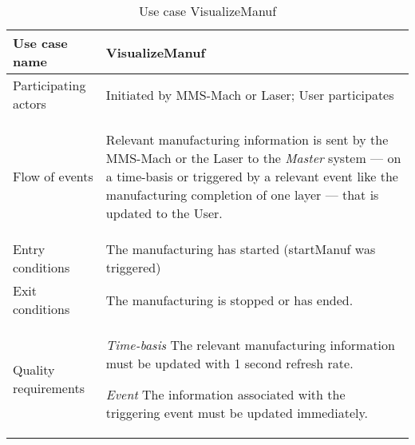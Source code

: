 \begin{table}[!hbt]
  \captionsetup{justification=raggedright, singlelinecheck=false}
  \caption{Use case VisualizeManuf}
  \centering
  \begin{tabular}{p{}p{}}
    \hline
    Use case name & \textbf{VisualizeManuf} \\ \hline
     Participating actors      & Initiated by MMS-Mach or Laser; User participates \\ \hline
     Flow of events & \begin{enum-c}
     \item Relevant manufacturing information is sent by the MMS-Mach or the
       Laser to the \emph{Master} system --- on a time-basis or triggered by a
       relevant event like the manufacturing completion of one layer --- that is
       updated to the User.
     \end{enum-c}\\ \hline 
     Entry conditions & The manufacturing has started (startManuf was
     triggered)\\ \hline
      Exit conditions & The manufacturing is stopped or has ended. \\ \hline 
      Quality requirements & \begin{item-c}
      \item \emph{Time-basis} The relevant manufacturing information must be
        updated with 1 second refresh rate.
      \item \emph{Event} The information associated with the triggering event
        must be updated immediately.
      \end{item-c} \\ \hline 
  \end{tabular}
\label{tab:vis-manuf}
\end{table}

